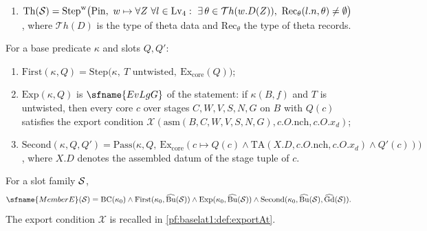 \begin{definition}
\begin{enumerate}[label=(\alph*)]
  and $O_x(O,t)\neq\emptyset$ for every object $O$ with $O.X=Y$, $O.p_0=l.p_0$ and every $t$ equal to
  $l.\mathrm{what})$. Here $\mathcal D(D)$ is the type of division data of $D$, $\mathrm{Rec}_{\mathrm{div}}$ the type of
  division records and $\mathrm{Mj}$ a tie between $Y$ and the reading of the row data.
\item $\mathrm{Th}(\baselatoneS)=\mathrm{Step}^{\mathrm w}\bigl(\mathrm{Pin},\ w\mapsto\forall Z\ \forall
  l\in\mathrm{Lv}_4:\ \exists\,\theta\in\mathcal{T}h(w.D(Z)),\ \mathrm{Rec}_{\theta}(l.n,\theta)\ne\emptyset\bigr)$, where
  $\mathcal Th(D)$ is the type of theta data and $\mathrm{Rec}_{\theta}$ the type of theta records.
\end{enumerate}
%
\end{definition}

\begin{definition}\label{pf:baselat1:def:memberE}
For a base predicate $\kappa$ and slots $Q,Q'$:
\begin{enumerate}[label=(\alph*)]
\item $\mathrm{First}(\kappa,Q)=\mathrm{Step}\bigl(\kappa,\ T\text{ untwisted},\ \mathrm{Ex}_{\mathrm{core}}(Q)\bigr)$;
\item $\mathrm{Exp}(\kappa,Q)$ is $\sfname{EvLgG}$ of the statement: if $\kappa(B,f)$ and $T$ is untwisted, then every
  core $c$ over stages $C,W,V,S,N,G$ on $B$ with $Q(c)$ satisfies the export condition
  $\mathcal{X}(\mathrm{asm}(B,C,W,V,S,N,G),c.O.\mathrm{nch},c.O.x_d)$;
\item $\mathrm{Second}(\kappa,Q,Q')=\mathrm{Pass}\bigl(\kappa,Q,\ \mathrm{Ex}_{\mathrm{core}}(c\mapsto Q(c)\wedge
  \mathrm{TA}(X.D,c.O.\mathrm{nch},c.O.x_d)\wedge Q'(c))\bigr)$, where $X.D$ denotes the assembled datum of the stage
  tuple of $c$.
\end{enumerate}
For a slot family $\mathcal S$,
\[
\sfname{MemberE}(\baselatoneS)=\mathrm{BC}(\kappa_0)\wedge
\mathrm{First}(\kappa_0,\widehat{\mathrm{Bu}}(\baselatoneS))\wedge
\mathrm{Exp}(\kappa_0,\widehat{\mathrm{Bu}}(\baselatoneS))\wedge
\mathrm{Second}(\kappa_0,\widehat{\mathrm{Bu}}(\baselatoneS),\widehat{\mathrm{Gd}}(\baselatoneS)).
\]
The export condition $\mathcal{X}$ is recalled in \cref{pf:baselat1:def:exportAt}.
%
\end{definition}

